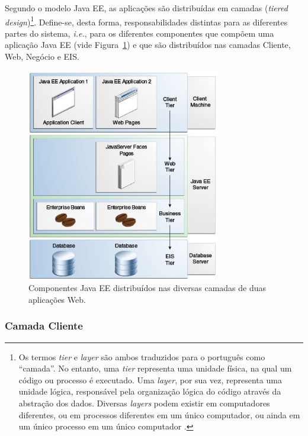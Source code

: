\documentclass[
  10.5pt,				  %
	openright,			%
	twoside,			  %
  a5paper,
  chapter=TITLE,	%
	section=TITLE,	%
  hyphens,        %
	english,        %
	brazil          %
]{abntex2}
\begin{document}
Segundo o modelo Java EE, as aplicações são distribuídas em camadas (\emph{tiered design})\footnote{Os termos \emph{tier} e \emph{layer} são ambos traduzidos para o português como ``camada''. No entanto, uma \emph{tier} representa uma unidade física, na qual um código ou processo é executado. Uma \emph{layer}, por sua vez, representa uma unidade lógica, responsável pela organização lógica do código através da abstração dos dados. Diversas \emph{layers} podem existir em computadores diferentes, ou em processos diferentes em um único computador, ou ainda em um único processo em um único computador \cite{lhotka}.}. Define-se, desta forma, responsabilidades distintas para as diferentes partes do sistema, \emph{i.e.}, para os diferentes componentes que compõem uma aplicação Java EE (vide Figura~\ref{fig:multitiered_app}) e que são distribuídos nas camadas Cliente, Web, Negócio e EIS.

\begin{figure}[!ht]
  \caption{\label{fig:multitiered_app}Componentes Java EE distribuídos nas diversas camadas de duas aplicações Web.}
  \begin{center}
    \includegraphics[width=0.75\textwidth]{multitiered_applications.png}
  \end{center}
\end{figure}

\subsubsection{Camada Cliente}
\end{document}
